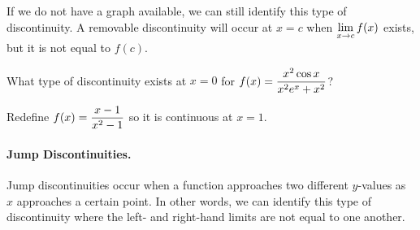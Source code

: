 \documentclass[12pt]{article}
\begin{document}
If we do not have a graph available, we can still identify this type of discontinuity. A removable discontinuity will occur at $x=c$ when $\displaystyle\lim_{x\to c}f(x)$ exists, but it is not equal to $f(c)$. 

\Example What type of discontinuity exists at $x=0$ for $f(x)=\displaystyle\frac{x^2\cos x}{x^2 e^x+x^2}$?

\vspace{45mm}

\Example Redefine $f(x)=\displaystyle\frac{x-1}{x^2-1}$ so it is continuous at $x=1$.

\newpage

\paragraph{Jump Discontinuities.} Jump discontinuities occur when a function approaches two different $y$-values as $x$ approaches a certain point. In other words, we can identify this type of discontinuity where the left- and right-hand limits are not equal to one another.

\begin{center}
        \end{center}
\end{document}
